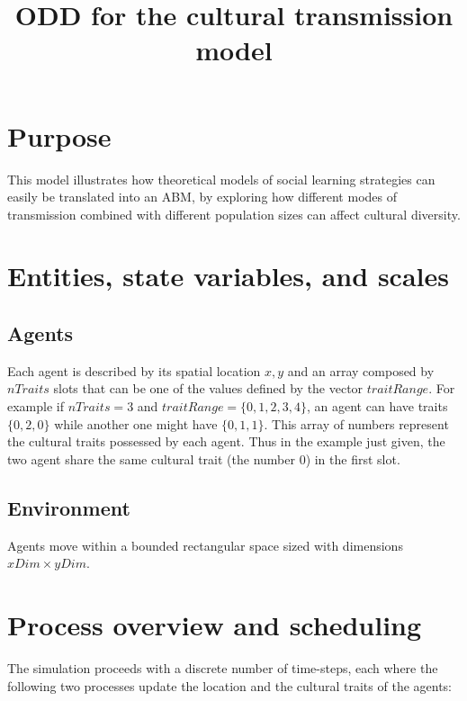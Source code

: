 \documentclass[11pt,a4paper,twocolumn,notitlepage]{article}
\begin{document}
\title{ODD for the cultural transmission model}
\maketitle

\section{Purpose}

This model illustrates how theoretical models of social learning strategies \citep{boyd1985,henrich_mcelreath2003,laland2004,mesoudi_2011} can easily be translated into an ABM, by exploring how different modes of transmission combined with different population sizes can affect cultural diversity.


\section{Entities, state variables, and scales}
\subsection{Agents}

Each agent is described by its spatial location $x,y$ and an array composed by $nTraits$ slots that can be one of the values defined by the vector $traitRange$. For example if $nTraits=3$ and $traitRange=\{0,1,2,3,4\}$, an agent can have traits $\{0,2,0\}$ while another one might have $\{0,1,1\}$. This array of numbers represent the cultural traits possessed by each agent. Thus in the example just given, the two agent share the same cultural trait (the number $0$) in the first slot.

\subsection{Environment}

Agents move within a bounded rectangular space sized with dimensions $xDim \times yDim$.

\section{Process overview and scheduling}

The simulation proceeds with a discrete number of time-steps, each where the following two processes update the location and the cultural traits of the agents:
\end{document}
